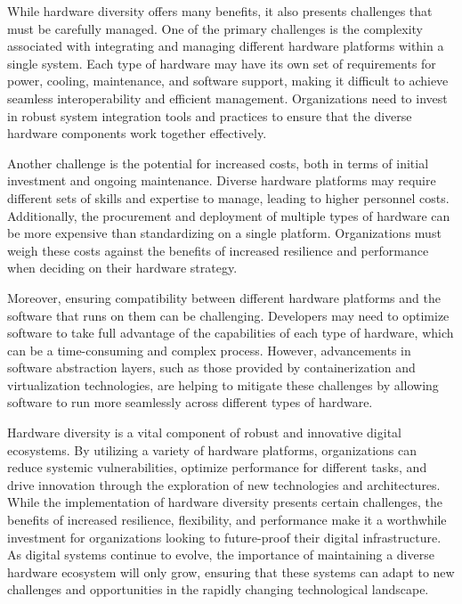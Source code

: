 \documentclass[12pt,twoside]{article}
\begin{document}
While hardware diversity offers many benefits, it also presents challenges that must be carefully managed. One of the primary challenges is the complexity associated with integrating and managing different hardware platforms within a single system. Each type of hardware may have its own set of requirements for power, cooling, maintenance, and software support, making it difficult to achieve seamless interoperability and efficient management. Organizations need to invest in robust system integration tools and practices to ensure that the diverse hardware components work together effectively.

Another challenge is the potential for increased costs, both in terms of initial investment and ongoing maintenance. Diverse hardware platforms may require different sets of skills and expertise to manage, leading to higher personnel costs. Additionally, the procurement and deployment of multiple types of hardware can be more expensive than standardizing on a single platform. Organizations must weigh these costs against the benefits of increased resilience and performance when deciding on their hardware strategy.

Moreover, ensuring compatibility between different hardware platforms and the software that runs on them can be challenging. Developers may need to optimize software to take full advantage of the capabilities of each type of hardware, which can be a time-consuming and complex process. However, advancements in software abstraction layers, such as those provided by containerization and virtualization technologies, are helping to mitigate these challenges by allowing software to run more seamlessly across different types of hardware.

Hardware diversity is a vital component of robust and innovative digital ecosystems. By utilizing a variety of hardware platforms, organizations can reduce systemic vulnerabilities, optimize performance for different tasks, and drive innovation through the exploration of new technologies and architectures. While the implementation of hardware diversity presents certain challenges, the benefits of increased resilience, flexibility, and performance make it a worthwhile investment for organizations looking to future-proof their digital infrastructure. As digital systems continue to evolve, the importance of maintaining a diverse hardware ecosystem will only grow, ensuring that these systems can adapt to new challenges and opportunities in the rapidly changing technological landscape.
\end{document}

